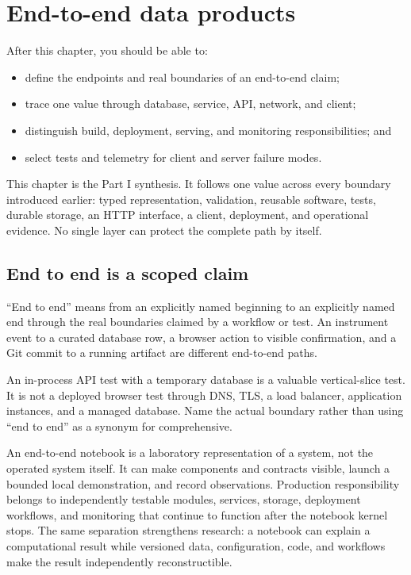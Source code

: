 \chapter{End-to-end data products}
\label{ch:end-to-end}

\begin{learningobjectives}
After this chapter, you should be able to:
\begin{itemize}
  \item define the endpoints and real boundaries of an end-to-end claim;
  \item trace one value through database, service, API, network, and client;
  \item distinguish build, deployment, serving, and monitoring responsibilities; and
  \item select tests and telemetry for client and server failure modes.
\end{itemize}
\end{learningobjectives}

\begin{chapterconnection}
This chapter is the Part I synthesis. It follows one value across every boundary
introduced earlier: typed representation, validation, reusable software,
tests, durable storage, an HTTP interface, a client, deployment, and operational
evidence. No single layer can protect the complete path by itself.
\end{chapterconnection}

\section{End to end is a scoped claim}

``End to end'' means from an explicitly named beginning to an explicitly named
end through the real boundaries claimed by a workflow or test. An instrument
event to a curated database row, a browser action to visible confirmation, and
a Git commit to a running artifact are different end-to-end paths.

An in-process API test with a temporary database is a valuable vertical-slice
test. It is not a deployed browser test through DNS, TLS, a load balancer,
application instances, and a managed database. Name the actual boundary rather
than using ``end to end'' as a synonym for comprehensive.

\begin{professionalbox}
An end-to-end notebook is a laboratory representation of a system, not the
operated system itself. It can make components and contracts visible, launch a
bounded local demonstration, and record observations. Production responsibility
belongs to independently testable modules, services, storage, deployment
workflows, and monitoring that continue to function after the notebook kernel
stops. The same separation strengthens research: a notebook can explain a
computational result while versioned data, configuration, code, and workflows
make the result independently reconstructible.
\end{professionalbox}

